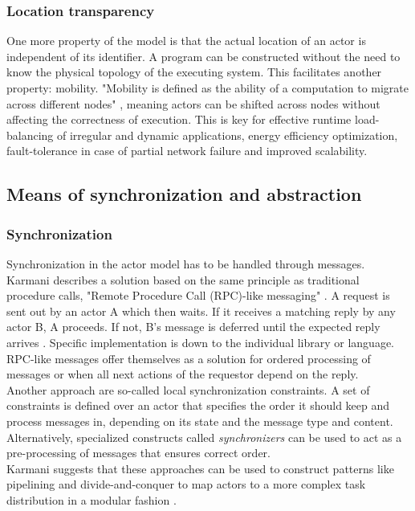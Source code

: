 \documentclass[A4]{article}
\begin{document}
\subsubsection{Location transparency}
One more property of the model is that the actual location of an actor is independent of its identifier. A program can be constructed without the need to know the physical topology of the executing system. This facilitates another property: mobility.
"Mobility is defined as the ability of a computation to migrate across different nodes" \cite[p.~5]{reference/parallel/KarmaniA11}, meaning actors can be shifted across nodes without affecting the correctness of execution. This is key for effective runtime load-balancing of irregular and dynamic applications, energy efficiency optimization, fault-tolerance in case of partial network failure and improved scalability. 

\subsection{Means of synchronization and abstraction}
\subsubsection{Synchronization}
Synchronization in the actor model  has to be handled through messages. Karmani describes a solution based on the same principle as traditional procedure calls, "Remote Procedure Call (RPC)-like messaging" \cite[p.~6]{reference/parallel/KarmaniA11}. A request is sent out by an actor A which then waits. If it receives a matching reply by any actor B, A proceeds. If not, B's message is deferred until the expected reply arrives \cite[p.~6]{reference/parallel/KarmaniA11}. Specific implementation is down to the individual library or language.
RPC-like messages offer themselves as a solution for ordered processing of messages or when all next actions of the requestor depend on the reply. \\
Another approach are so-called local synchronization constraints. A set of constraints is defined over an actor that specifies the order it should keep and process messages in, depending on its state and the message type and content. \cite[p.~34]{Agha2016:2} \\
Alternatively, specialized constructs called {\it synchronizers} can be used to act as a pre-processing of messages that ensures correct order. \\
Karmani suggests that these approaches can be used to construct patterns like pipelining and divide-and-conquer to map actors to a more complex task distribution in a modular fashion \cite[p.~6]{reference/parallel/KarmaniA11}.
\end{document}
